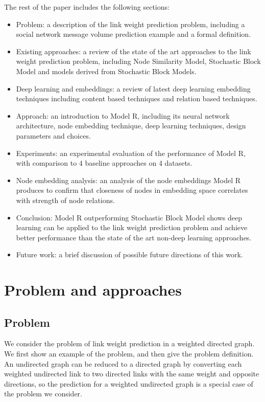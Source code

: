 \documentclass[book,12pt]{WSUThesis}
\theoremstyle{definition}
\begin{document}
The rest of the paper includes the following sections:
\begin{itemize}
	\item Problem: a description of the link weight prediction problem, including a social network message volume prediction example and a formal definition.
	\item Existing approaches: a review of the state of the art approaches to the link weight prediction problem, including Node Similarity Model, Stochastic Block Model and models derived from Stochastic Block Models.
	\item Deep learning and embeddings: a review of latest deep learning embedding techniques including content based techniques and relation based techniques.
	\item Approach: an introduction to Model R, including its neural network architecture, node embedding technique, deep learning techniques, design parameters and choices.
	\item Experiments: an experimental evaluation of the performance of Model R, with comparison to 4 baseline approaches on 4 datasets.
	\item Node embedding analysis: an analysis of the node embeddings Model R produces to confirm that closeness of nodes in embedding space correlates with strength of node relations.
	\item Conclusion: Model R outperforming Stochastic Block Model shows deep learning can be applied to the link weight prediction problem and achieve better performance than the state of the art non-deep learning approaches.
	\item Future work: a brief discussion of possible future directions of this work.
\end{itemize}

\chapter{Problem and approaches}

\section{Problem}
We consider the problem of link weight prediction in a weighted directed graph.
We first show an example of the problem,
and then give the problem definition.
An undirected graph can be reduced to a directed graph by converting each weighted undirected link to two directed links with the same weight and opposite directions,
so the prediction for a weighted undirected graph is a special case of the problem we consider.
\end{document}
